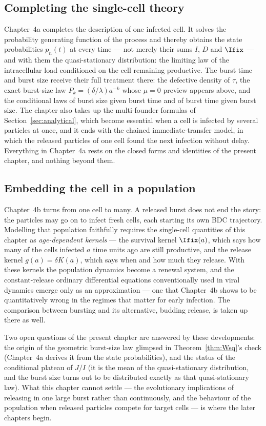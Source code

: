 \subsection*{Completing the single-cell theory}

Chapter~4a completes the description of one infected cell. It solves the
probability generating function of the process and thereby obtains the state
probabilities $p_n(t)$ at every time --- not merely their sums $I$, $D$ and
$\Ifix$ --- and with them the quasi-stationary distribution: the limiting law
of the intracellular load conditioned on the cell remaining productive. The
burst time and burst size receive their full treatment there: the defective
density of $\tau$, the exact burst-size law $P_k=(\delta/\lambda)a^{-k}$ whose
$\mu=0$ preview appears above, and the conditional laws of burst size given
burst time and of burst time given burst size. The chapter also takes up the
multi-founder formulas of Section~\ref{sec:analytical}, which become essential
when a cell is infected by several particles at once, and it ends with the
chained immediate-transfer model, in which the released particles of one cell
found the next infection without delay. Everything in Chapter~4a rests on the
closed forms and identities of the present chapter, and nothing beyond them.

\subsection*{Embedding the cell in a population}

Chapter~4b turns from one cell to many. A released burst does not end the
story: the particles may go on to infect fresh cells, each starting its own
BDC trajectory. Modelling that population faithfully requires the
single-cell quantities of this chapter as \textit{age-dependent kernels} ---
the survival kernel $\Ifix(a)$, which says how many of the cells infected $a$
time units ago are still productive, and the release kernel $g(a)=\delta K(a)$,
which says when and how much they release. With these kernels the population
dynamics become a renewal system, and the constant-release ordinary
differential equations conventionally used in viral dynamics emerge only as an
approximation --- one that Chapter~4b shows to be quantitatively wrong in the
regimes that matter for early infection. The comparison between bursting and
its alternative, budding release, is taken up there as well.

Two open questions of the present chapter are answered by these developments:
the origin of the geometric burst-size law glimpsed in
Theorem~\ref{thm:Wsq}'s check (Chapter~4a derives it from the state
probabilities), and the status of the conditional plateau of $J/I$ (it is the
mean of the quasi-stationary distribution, and the burst size turns out to be
distributed exactly as that quasi-stationary law). What this chapter cannot
settle --- the evolutionary implications of releasing in one large burst
rather than continuously, and the behaviour of the population when released
particles compete for target cells --- is where the later chapters begin.
